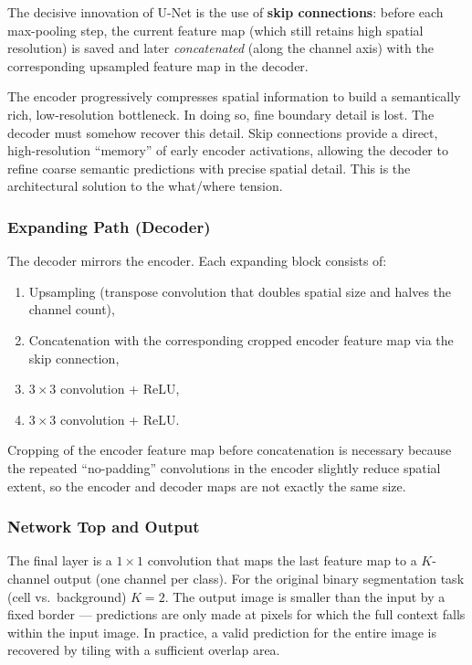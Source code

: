 \documentclass[11pt,a4paper]{article}
\newcommand{\term}[1]{\textcolor{DefGreen}{\textbf{#1}}}
\begin{document}
The decisive innovation of U-Net is the use of \term{skip connections}: before each max-pooling step, the current feature map (which still retains high spatial resolution) is saved and later \emph{concatenated} (along the channel axis) with the corresponding upsampled feature map in the decoder.

\begin{insightbox}
The encoder progressively compresses spatial information to build a semantically rich, low-resolution bottleneck. In doing so, fine boundary detail is lost. The decoder must somehow recover this detail. Skip connections provide a direct, high-resolution ``memory'' of early encoder activations, allowing the decoder to refine coarse semantic predictions with precise spatial detail. This is the architectural solution to the what/where tension.
\end{insightbox}

\subsubsection{Expanding Path (Decoder)}

The decoder mirrors the encoder. Each expanding block consists of:
\begin{enumerate}
  \item Upsampling (transpose convolution that doubles spatial size and halves the channel count),
  \item Concatenation with the corresponding cropped encoder feature map via the skip connection,
  \item $3\times 3$ convolution + ReLU,
  \item $3\times 3$ convolution + ReLU.
\end{enumerate}
Cropping of the encoder feature map before concatenation is necessary because the repeated ``no-padding'' convolutions in the encoder slightly reduce spatial extent, so the encoder and decoder maps are not exactly the same size.

\subsubsection{Network Top and Output}

The final layer is a $1\times 1$ convolution that maps the last feature map to a $K$-channel output (one channel per class). For the original binary segmentation task (cell vs.\ background) $K = 2$. The output image is smaller than the input by a fixed border — predictions are only made at pixels for which the full context falls within the input image. In practice, a valid prediction for the entire image is recovered by tiling with a sufficient overlap area.
\end{document}
